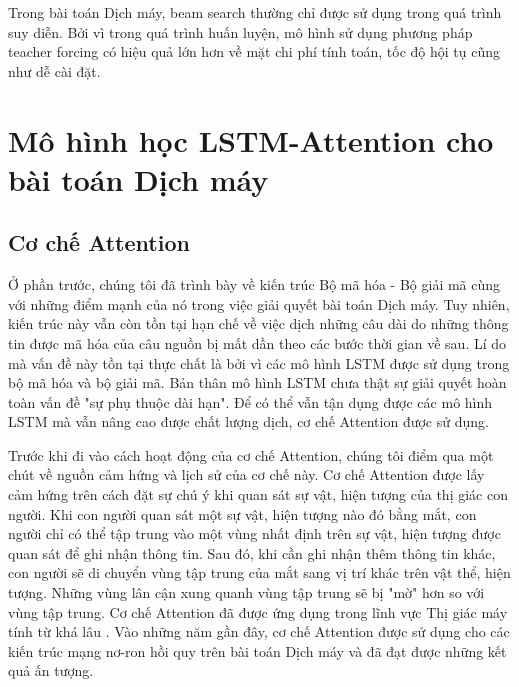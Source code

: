 Trong bài toán Dịch máy, beam search thường chỉ được sử dụng trong quá trình suy diễn. Bởi vì trong quá trình huấn luyện, mô hình sử dụng phương pháp teacher forcing có hiệu quả lớn hơn về mặt chi phí tính toán, tốc độ hội tụ cũng như dễ cài đặt.
\section{Mô hình học LSTM-Attention cho bài toán Dịch máy}
\subsection{Cơ chế Attention}
Ở phần trước, chúng tôi đã trình bày về kiến trúc Bộ mã hóa - Bộ giải mã cùng với những điểm mạnh của nó trong việc giải quyết bài toán Dịch máy. Tuy nhiên, kiến trúc này vẫn còn tồn tại hạn chế về việc dịch những câu dài do những thông tin được mã hóa của câu nguồn bị mất dần theo các bước thời gian về sau. Lí do mà vấn đề này tồn tại thực chất là bởi vì các mô hình LSTM được sử dụng trong bộ mã hóa và bộ giải mã. Bản thân mô hình LSTM chưa thật sự giải quyết hoàn toàn vấn đề "sự phụ thuộc dài hạn". Để có thể vẫn tận dụng được các mô hình LSTM mà vẫn nâng cao được chất lượng dịch, cơ chế Attention được sử dụng.

Trước khi đi vào cách hoạt động của cơ chế Attention, chúng tôi điểm qua một chút về nguồn cảm hứng và lịch sử của cơ chế này. Cơ chế Attention được lấy cảm hứng trên cách đặt sự chú ý khi quan sát sự vật, hiện tượng của thị giác con người. Khi con người quan sát một sự vật, hiện tượng nào đó bằng mắt, con người chỉ có thể tập trung vào một vùng nhất định trên sự vật, hiện tượng được quan sát để ghi nhận thông tin. Sau đó, khi cần ghi nhận thêm thông tin khác, con người sẽ di chuyển vùng tập trung của mắt sang vị trí khác trên vật thể, hiện tượng. Những vùng lân cận xung quanh vùng tập trung sẽ bị "mờ" hơn so với vùng tập trung. Cơ chế Attention đã được ứng dụng trong lĩnh vực Thị giác máy tính từ khá lâu \cite{attentionhistory2010} \cite{attentionhistory2011}. Vào những năm gần đây, cơ chế Attention được sử dụng cho các kiến trúc mạng nơ-ron hồi quy trên bài toán Dịch máy và đã đạt được những kết quả ấn tượng.

